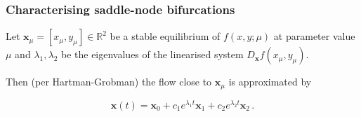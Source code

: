 \documentclass[./main.tex]{subfiles}
\begin{document}
\begin{frame}[t, label=slide05]
        \frametitle{Characterising saddle-node bifurcations}

        \footnotesize

        Let $\boldsymbol{x}_{\mu}=[x_{\mu},y_{\mu}]\in \mathbb{R}^{2}$ be a stable equilibrium of $f(x,y;\mu)$ at parameter value $\mu$ and $\lambda_{1},\lambda_{2}$ be the eigenvalues of the linearised system $D_{\boldsymbol{x}}f(x_{\mu},y_{\mu})$.

        \vspace{2mm}

        Then (per Hartman-Grobman) the flow close to $\boldsymbol{x}_{\mu}$ is approximated by

        \begin{equation*}
            \boldsymbol{x}(t) = \boldsymbol{x}_{0} + c_{1}e^{\lambda_{1}t}\boldsymbol{x}_{1} + c_{2}e^{\lambda_{2}t}\boldsymbol{x}_{2}\,. 
        \end{equation*}

        \vspace{5mm}


\end{frame}
\end{document}
